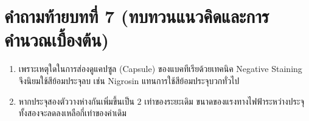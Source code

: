 \section*{คำถามท้ายบทที่ 7 (ทบทวนแนวคิดและการคำนวณเบื้องต้น)}
\begin{enumerate}
    \item เพราะเหตุใดในการส่องดูแคปซูล (Capsule) ของแบคทีเรียด้วยเทคนิค Negative Staining จึงนิยมใช้สีย้อมประจุลบ เช่น Nigrosin แทนการใช้สีย้อมประจุบวกทั่วไป
    \item หากประจุสองตัววางห่างกันเพิ่มขึ้นเป็น $2$ เท่าของระยะเดิม ขนาดของแรงทางไฟฟ้าระหว่างประจุทั้งสองจะลดลงเหลือกี่เท่าของค่าเดิม
\end{enumerate}
